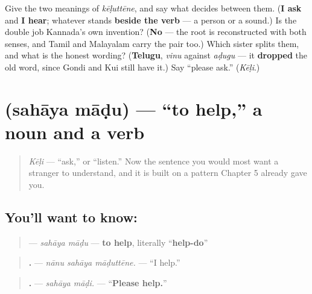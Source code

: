 \begin{tcolorbox}[breakable,colback=teal!4,colframe=teal!35!black,title={Before you move on}]
Give the two meanings of \emph{kēḷuttēne}, and say what decides between them. (\textbf{I ask} and \textbf{I hear}; whatever stands \textbf{beside the verb} — a person or a sound.) Is the double job Kannada's own invention? (\textbf{No} — the root is reconstructed with both senses, and Tamil and Malayalam carry the pair too.) Which sister splits them, and what is the honest wording? (\textbf{Telugu}, \emph{vinu} against \emph{aḍugu} — it \textbf{dropped} the old word, since Gondi and Kui still have it.) Say \textquotedblleft{}please ask.\textquotedblright{} (\emph{Kēḷi}.)
\end{tcolorbox}
\section[\texorpdfstring{\kn{ಸಹಾಯ} \kn{ಮಾಡು} (sahāya māḍu)}{ಸಹಾಯ ಮಾಡು (sahāya māḍu)}]{  (sahāya māḍu) — \textquotedblleft{}to help,\textquotedblright{} a noun and a verb}

\label{lesson:KA-C34-sahaya-maadu}



\begin{quote}
\emph{Kēḷi} — \textquotedblleft{}ask,\textquotedblright{} or \textquotedblleft{}listen.\textquotedblright{} Now the sentence you would most want a stranger to understand, and it is built on a pattern Chapter 5 already gave you.
\end{quote}

\subsection*{You'll want to know:  }
\begin{quote}
\textbf{ } — \emph{sahāya māḍu} — \textbf{to help}, literally \textquotedblleft{}\textbf{help-do}\textquotedblright{}
\end{quote}

\begin{quote}
\textbf{  .} — \emph{nānu sahāya māḍuttēne.} — \textquotedblleft{}I help.\textquotedblright{}
\end{quote}

\begin{quote}
\textbf{ .} — \emph{sahāya māḍi.} — \textquotedblleft{}\textbf{Please help.}\textquotedblright{}
\end{quote}

